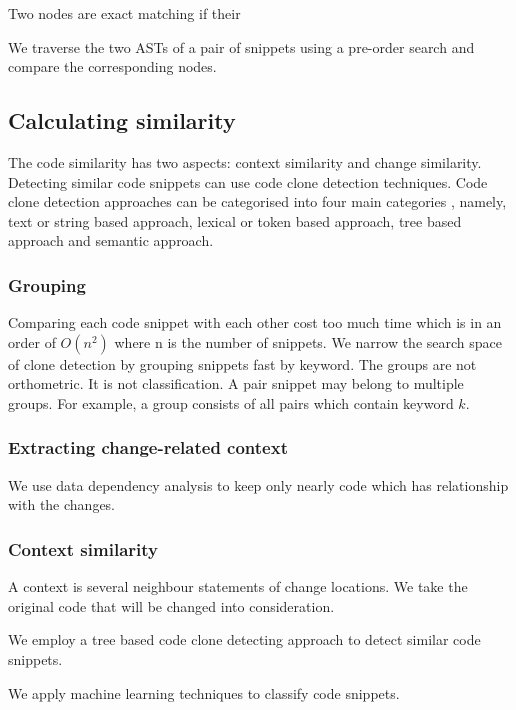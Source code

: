 \documentclass{sig-alternate-05-2015}
\begin{document}
\begin{def1}
Two nodes are exact matching if their 
\end{def1}

We traverse the two ASTs of a pair of snippets using a pre-order search and compare the corresponding nodes.


\subsection{Calculating similarity}
The code similarity has two aspects: context similarity and change similarity. Detecting similar code snippets can use code clone detection techniques. Code clone detection approaches can be categorised into four main categories \cite{DBLP:journals/corr/Onuoha16}, namely, text or string based approach, lexical or token based approach, tree based approach and semantic approach.

\subsubsection{Grouping}
Comparing each code snippet with each other cost too much time which is in an order of \begin{math}O(n^2) \end{math} where n is the number of snippets. We narrow the search space of clone detection by grouping snippets fast by keyword. The groups are not orthometric. It is not classification. A pair snippet may belong to multiple groups. For example, a group consists of all pairs which contain keyword $k$.

\subsubsection{Extracting change-related context}
We use data dependency analysis to keep only nearly code which has relationship with the changes.

\subsubsection{Context similarity}
A context is several neighbour statements of change locations. We take the original code that will be changed into consideration.  
 
We employ a tree based code clone detecting approach to detect similar code snippets.

We apply machine learning techniques to classify code snippets.
\end{document}
